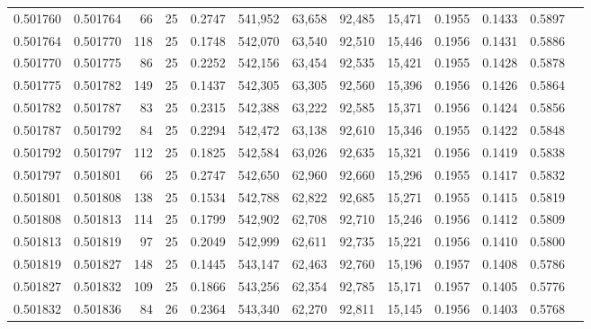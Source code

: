 \begin{tabular}{rrrrrrrrrrrrr}
0.501760 & 0.501764 &  66 &  25 &                                     0.2747 & 541,952 &  63,658 &  92,485 &  15,471 & 0.1955 & 0.1433 & 0.5897 \\
0.501764 & 0.501770 & 118 &  25 &                                     0.1748 & 542,070 &  63,540 &  92,510 &  15,446 & 0.1956 & 0.1431 & 0.5886 \\
0.501770 & 0.501775 &  86 &  25 &                                     0.2252 & 542,156 &  63,454 &  92,535 &  15,421 & 0.1955 & 0.1428 & 0.5878 \\
0.501775 & 0.501782 & 149 &  25 &                                     0.1437 & 542,305 &  63,305 &  92,560 &  15,396 & 0.1956 & 0.1426 & 0.5864 \\
0.501782 & 0.501787 &  83 &  25 &                                     0.2315 & 542,388 &  63,222 &  92,585 &  15,371 & 0.1956 & 0.1424 & 0.5856 \\
0.501787 & 0.501792 &  84 &  25 &                                     0.2294 & 542,472 &  63,138 &  92,610 &  15,346 & 0.1955 & 0.1422 & 0.5848 \\
0.501792 & 0.501797 & 112 &  25 &                                     0.1825 & 542,584 &  63,026 &  92,635 &  15,321 & 0.1956 & 0.1419 & 0.5838 \\
0.501797 & 0.501801 &  66 &  25 &                                     0.2747 & 542,650 &  62,960 &  92,660 &  15,296 & 0.1955 & 0.1417 & 0.5832 \\
0.501801 & 0.501808 & 138 &  25 &                                     0.1534 & 542,788 &  62,822 &  92,685 &  15,271 & 0.1955 & 0.1415 & 0.5819 \\
0.501808 & 0.501813 & 114 &  25 &                                     0.1799 & 542,902 &  62,708 &  92,710 &  15,246 & 0.1956 & 0.1412 & 0.5809 \\
0.501813 & 0.501819 &  97 &  25 &                                     0.2049 & 542,999 &  62,611 &  92,735 &  15,221 & 0.1956 & 0.1410 & 0.5800 \\
0.501819 & 0.501827 & 148 &  25 &                                     0.1445 & 543,147 &  62,463 &  92,760 &  15,196 & 0.1957 & 0.1408 & 0.5786 \\
0.501827 & 0.501832 & 109 &  25 &                                     0.1866 & 543,256 &  62,354 &  92,785 &  15,171 & 0.1957 & 0.1405 & 0.5776 \\
0.501832 & 0.501836 &  84 &  26 &                                     0.2364 & 543,340 &  62,270 &  92,811 &  15,145 & 0.1956 & 0.1403 & 0.5768 \\

\end{tabular}

